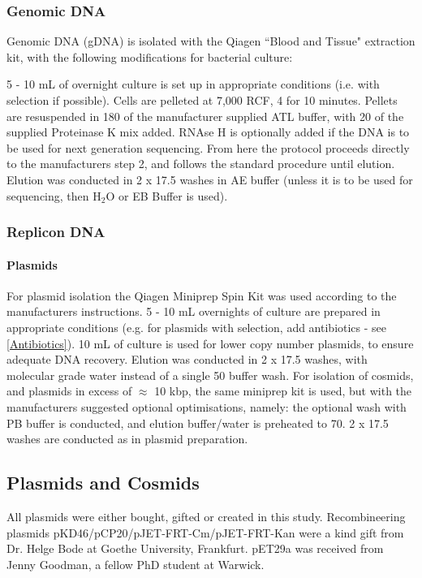 	\subsubsection{Genomic DNA}\label{gdna}
		Genomic DNA (gDNA) is isolated with the Qiagen ``Blood and Tissue" extraction kit, with the following modifications for bacterial culture:

		 5 - 10 mL of overnight culture is set up in appropriate conditions (i.e. with selection if possible). Cells are pelleted at 7,000 RCF, 4\degC{} for 10 minutes. Pellets are resuspended in 180\ul{} of the manufacturer supplied ATL buffer, with 20\ul{} of the supplied Proteinase K mix added. RNAse H is optionally added if the DNA is to be used for next generation sequencing. From here the protocol proceeds directly to the manufacturers step 2, and follows the standard procedure until elution. Elution was conducted in 2 x 17.5\ul{} washes in AE buffer (unless it is to be used for sequencing, then H$_2$O or EB Buffer is used).

	\subsubsection{Replicon DNA}\label{Plasmids}
			\paragraph{Plasmids}
		For plasmid isolation the Qiagen Miniprep Spin Kit was used according to the manufacturers instructions. 5 - 10 mL overnights of culture are prepared in appropriate conditions (e.g. for plasmids with selection, add antibiotics - see \vref{Antibiotics}). 10 mL of culture is used for lower copy number plasmids, to ensure adequate DNA recovery. Elution was conducted in 2 x 17.5 \ul{} washes, with molecular grade water instead of a single 50 \ul{} buffer wash. For isolation of cosmids, and plasmids in excess of $\approx$ 10 kbp, the same miniprep kit is used, but with the manufacturers suggested optional optimisations, namely: the optional wash with PB buffer is conducted, and elution buffer/water is preheated to 70\degC. 2 x 17.5 \ul{} washes are conducted as in plasmid preparation.

\newpage
	\subsection{Plasmids and Cosmids}
	All plasmids were either bought, gifted or created in this study. Recombineering plasmids pKD46/pCP20/pJET-FRT-Cm/pJET-FRT-Kan were a kind gift from Dr. Helge Bode at Goethe University, Frankfurt. pET29a was received from Jenny Goodman, a fellow PhD student at Warwick.
	
